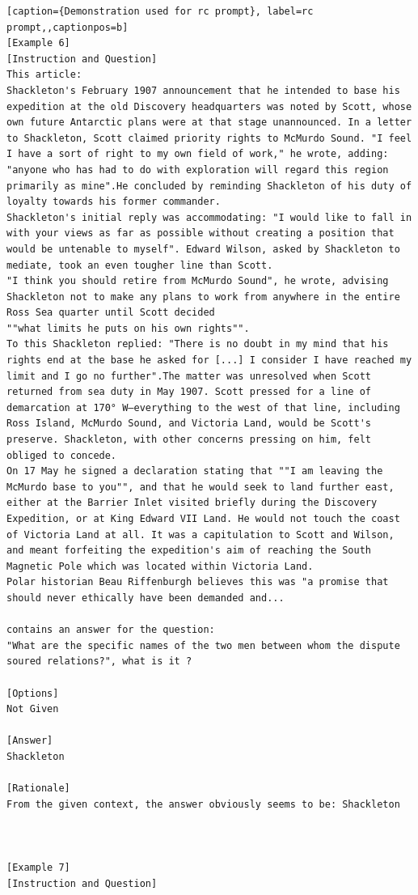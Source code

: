\begin{lstlisting}[caption={Demonstration used for rc prompt}, label=rc prompt,,captionpos=b]
[Example 6]
[Instruction and Question]
This article: 
Shackleton's February 1907 announcement that he intended to base his expedition at the old Discovery headquarters was noted by Scott, whose own future Antarctic plans were at that stage unannounced. In a letter to Shackleton, Scott claimed priority rights to McMurdo Sound. "I feel I have a sort of right to my own field of work," he wrote, adding: "anyone who has had to do with exploration will regard this region primarily as mine".He concluded by reminding Shackleton of his duty of loyalty towards his former commander.
Shackleton's initial reply was accommodating: "I would like to fall in with your views as far as possible without creating a position that would be untenable to myself". Edward Wilson, asked by Shackleton to mediate, took an even tougher line than Scott. 
"I think you should retire from McMurdo Sound", he wrote, advising Shackleton not to make any plans to work from anywhere in the entire Ross Sea quarter until Scott decided 
""what limits he puts on his own rights"". 
To this Shackleton replied: "There is no doubt in my mind that his rights end at the base he asked for [...] I consider I have reached my limit and I go no further".The matter was unresolved when Scott returned from sea duty in May 1907. Scott pressed for a line of demarcation at 170° W—everything to the west of that line, including Ross Island, McMurdo Sound, and Victoria Land, would be Scott's preserve. Shackleton, with other concerns pressing on him, felt obliged to concede. 
On 17 May he signed a declaration stating that ""I am leaving the McMurdo base to you"", and that he would seek to land further east, either at the Barrier Inlet visited briefly during the Discovery Expedition, or at King Edward VII Land. He would not touch the coast of Victoria Land at all. It was a capitulation to Scott and Wilson, and meant forfeiting the expedition's aim of reaching the South Magnetic Pole which was located within Victoria Land. 
Polar historian Beau Riffenburgh believes this was "a promise that should never ethically have been demanded and... 

contains an answer for the question: 
"What are the specific names of the two men between whom the dispute soured relations?", what is it ?

[Options]
Not Given

[Answer]
Shackleton

[Rationale]
From the given context, the answer obviously seems to be: Shackleton



[Example 7]
[Instruction and Question]

    \end{lstlisting}
    




